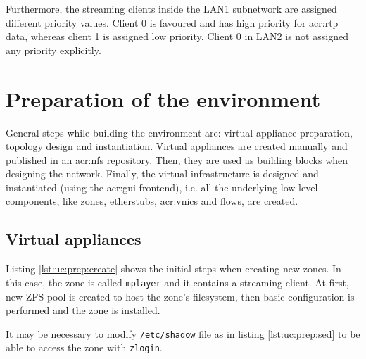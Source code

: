 \documentclass[11pt,openany]{book}
\begin{document}
        Furthermore, the streaming clients inside the LAN1 subnetwork are assigned different priority values. Client 0
        is favoured and has high priority for \gls{acr:rtp} data, whereas client 1 is assigned low priority. Client 0 in
        LAN2 is not assigned any priority explicitly.


    \section{Preparation of the environment}
    \label{sec:uc:prep}

      General steps while building the environment are: virtual appliance preparation, topology design and
      instantiation. Virtual appliances are created manually and published in an \gls{acr:nfs} repository. Then, they
      are used as building blocks when designing the network. Finally, the virtual infrastructure is designed and
      instantiated (using the \gls{acr:gui} frontend), i.e.  all the underlying low-level components, like zones,
      etherstubs, \gls{acr:vnic}s and flows, are created.


      \subsection{Virtual appliances}
      \label{ssub:case:prep:va}

        Listing \ref{lst:uc:prep:create} shows the initial steps when creating new zones. In this case, the zone is
        called \texttt{mplayer} and it contains a streaming client. At first, new ZFS pool is created to host the zone's
        filesystem, then basic configuration is performed and the zone is installed. \\

        \noindent
        \begin{minipage}{\textwidth}
          
        \end{minipage}

        \noindent
        It may be necessary to modify \texttt{/etc/shadow} file as in listing \ref{lst:uc:prep:sed} to be able to access
        the zone with \texttt{zlogin}. \\

        \noindent
        \begin{minipage}{\textwidth}
          
        \end{minipage}
\end{document}

